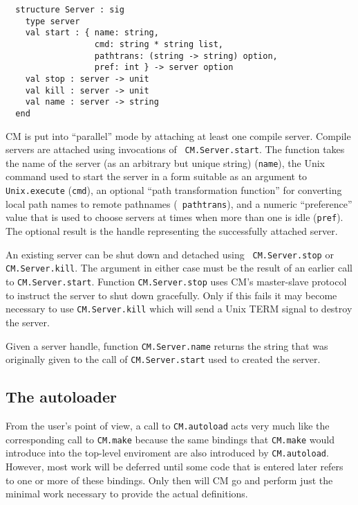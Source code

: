 \documentclass{article}
\begin{document}
\begin{verbatim}
  structure Server : sig
    type server
    val start : { name: string,
                  cmd: string * string list,
                  pathtrans: (string -> string) option,
                  pref: int } -> server option
    val stop : server -> unit
    val kill : server -> unit
    val name : server -> string
  end
\end{verbatim}

CM is put into ``parallel'' mode by attaching at least one compile
server.  Compile servers are attached using invocations of {\tt
CM.Server.start}.  The function takes the name of the server (as an
arbitrary but unique string) ({\tt name}), the Unix command used to
start the server in a form suitable as an argument to {\tt
Unix.execute} ({\tt cmd}), an optional ``path transformation
function'' for converting local path names to remote pathnames ({\tt
pathtrans}), and a numeric ``preference'' value that is used to choose
servers at times when more than one is idle ({\tt pref}).  The
optional result is the handle representing the successfully attached
server.

An existing server can be shut down and detached using {\tt
CM.Server.stop} or {\tt CM.Server.kill}.  The argument in either case
must be the result of an earlier call to {\tt CM.Server.start}.
Function {\tt CM.Server.stop} uses CM's master-slave protocol to
instruct the server to shut down gracefully.  Only if this fails it
may become necessary to use {\tt CM.Server.kill} which will send a
Unix TERM signal to destroy the server.

Given a server handle, function {\tt CM.Server.name} returns the
string that was originally given to the call of {\tt CM.Server.start}
used to created the server.

\subsection{The autoloader}
\label{sec:autoload}

From the user's point of view, a call to {\tt CM.autoload} acts very
much like the corresponding call to {\tt CM.make} because the same
bindings that {\tt CM.make} would introduce into the top-level
enviroment are also introduced by {\tt CM.autoload}.  However, most
work will be deferred until some code that is entered later refers to
one or more of these bindings.  Only then will CM go and perform just
the minimal work necessary to provide the actual definitions.
\end{document}
